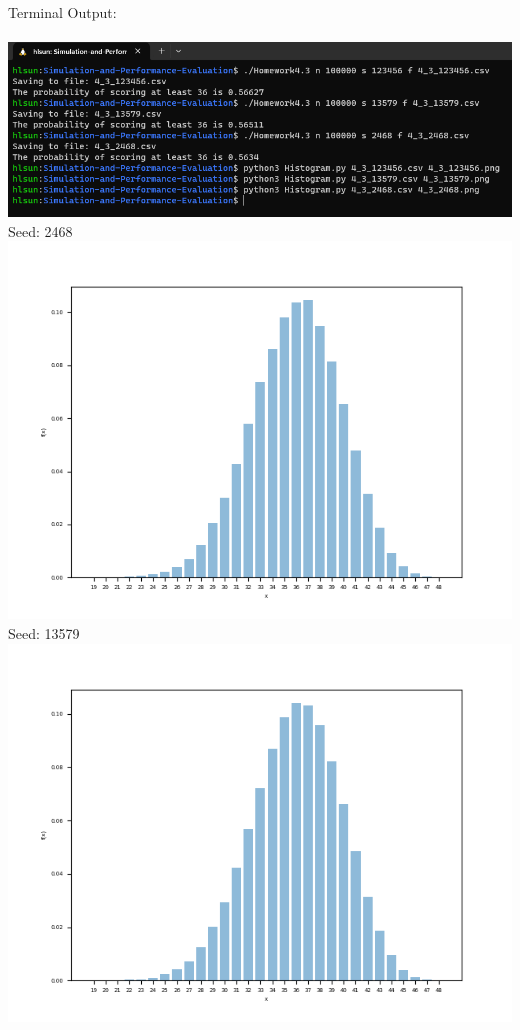 \noindent Terminal Output:\\\\
\includegraphics[scale=0.6]{Sections/Q3/4_3_terminal.png}\\
\newpage
Seed: 2468\\
\includegraphics[scale=1]{Sections/Q3/4_3_2468.png}\\
\newpage
Seed: 13579\\
\includegraphics[scale=1]{Sections/Q3/4_3_13579.png}\\
